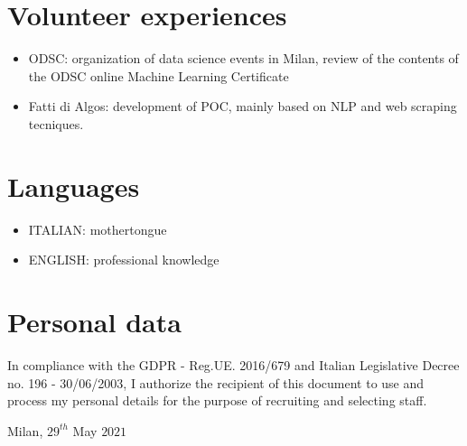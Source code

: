 \documentclass[11pt,a4paper,sans]{moderncv}        %
\begin{document}
\section{Volunteer experiences}
\begin{itemize}
 \item ODSC: organization of data science events in Milan, review of the contents of the ODSC online Machine Learning Certificate
 \item Fatti di Algos: development of POC, mainly based on NLP and web scraping tecniques. 
\end{itemize} 

\section{Languages}
\begin{itemize}
\item ITALIAN: mothertongue
\item ENGLISH: professional knowledge
\end{itemize} 

\section{Personal data}
In compliance with the GDPR - Reg.UE. 2016/679 and Italian Legislative Decree no. 196 - 30/06/2003, I authorize the recipient of this document to use and process my personal details for the purpose of recruiting and selecting staff. 

\bigskip
\bigskip
\bigskip
\bigskip
\bigskip
\bigskip
\bigskip
\bigskip
\bigskip
\bigskip
\bigskip
\bigskip
\bigskip
\bigskip
\bigskip
\bigskip
\bigskip
\bigskip
\bigskip
\bigskip
\bigskip
\bigskip
\bigskip
\bigskip
Milan, $29^{th}$ May $2021$
\end{document}
